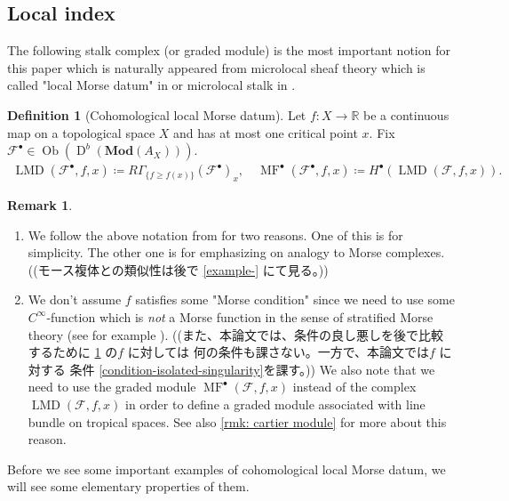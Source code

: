 \documentclass[a4paper,dvipdfmx,reqno,12pt]{amsart}
\theoremstyle{definition}
\newtheorem{Def}[Thm]{Definition}
\newtheorem{Rmk}[Thm]{Remark}
\newcommand{\deq}{\coloneqq}
\newcommand{\R}{\mathbb{R}}%
\newcommand{\mcal}[1]{\mathcal{#1}}%
\newcommand{\opn}[1]{\operatorname{#1}}
\newcommand{\catn}[1]{\mathbf{#1}}
\numberwithin{equation}{section}
\begin{document}
\subsection{Local index}

The following stalk complex (or graded module) is 
the most important notion
for this paper which is naturally appeared from 
microlocal sheaf theory 
which is called "local Morse datum" in \cite[p.271]{MR2031639} 
or microlocal stalk in \cite{MR4132582}.
\begin{Def}[{Cohomological local Morse datum}]
\label{definition-local-morse-data}
Let $f\colon X\to \R$ be a continuous map on a 
topological space $X$ and has 
at most one critical point $x$. Fix 
$\mathcal{F}^{\bullet}\in 
\opn{Ob}(\opn{D}^{b}(\catn{Mod}(A_X)))$.
\begin{align}
\opn{LMD}(\mcal{F}^{\bullet},f,x)\deq R\Gamma_{\{f\geq f(x)\}}
(\mcal{F}^{\bullet})_x, \quad \opn{MF}^{\bullet}(\mcal{F}^{\bullet},f,x)\deq 
H^{\bullet}(\opn{LMD}(\mcal{F},f,x)).
\end{align}
\end{Def}

\begin{Rmk}
\begin{enumerate}
\item We follow the above notation from 
\cite[p.271]{MR2031639} for two reasons.
One of this is for simplicity. 
The other one is for emphasizing on analogy to
Morse complexes.
((モース複体との類似性は後で \cref{example-} にて見る。))
\item We don't assume $f$ satisfies some 
"Morse condition" since
 we need to use some $C^{\infty}$-function
which is \emph{not} a Morse function in the sense of 
stratified Morse theory (see for example
\cite[Part 1.2.1]{MR932724}). 
((また、本論文では、条件の良し悪しを後で比較するために
\cref{definition-local-morse-data} の$f$ に対しては
何の条件も課さない。一方で、本論文では$f$ に対する
条件 \cref{condition-isolated-singularity}を課す。))
We also note that we need to use 
the graded module $\opn{MF}^{\bullet}(\mcal{F},f,x)$ instead of 
the complex $\opn{LMD}(\mcal{F},f,x)$ in order to define
a graded module associated with line bundle on tropical
spaces. See also \cref{rmk: cartier module} for more about 
this reason.
\end{enumerate}
\end{Rmk}

Before we see some important examples of cohomological
local Morse datum, we will see some elementary
properties of them.
\end{document}
